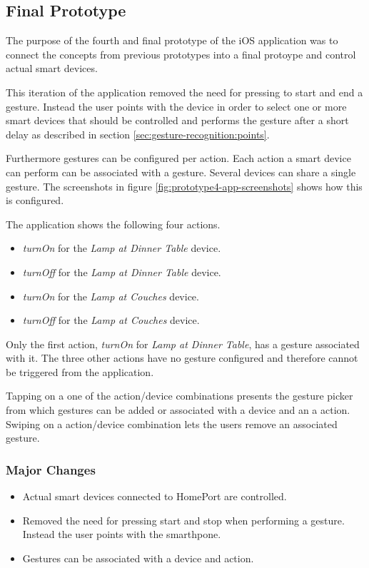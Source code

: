 \subsection{Final Prototype}
\label{sec:implementation:prototypes:prototype4}

The purpose of the fourth and final prototype of the iOS application was to connect the concepts from previous prototypes into a final protoype and control actual smart devices.

This iteration of the application removed the need for pressing to start and end a gesture. Instead the user points with the device in order to select one or more smart devices that should be controlled and performs the gesture after a short delay as described in section \ref{sec:gesture-recognition:points}.

Furthermore gestures can be configured per action. Each action a smart device can perform can be associated with a gesture. Several devices can share a single gesture. The screenshots in figure \ref{fig:prototype4-app-screenshots} shows how this is configured.

The application shows the following four actions.

\begin{itemize}
\item \emph{turnOn} for the \emph{Lamp at Dinner Table} device.
\item \emph{turnOff} for the \emph{Lamp at Dinner Table} device.
\item \emph{turnOn} for the \emph{Lamp at Couches} device.
\item \emph{turnOff} for the \emph{Lamp at Couches} device.
\end{itemize}

Only the first action, \emph{turnOn} for \emph{Lamp at Dinner Table}, has a gesture associated with it. The three other actions have no gesture configured and therefore cannot be triggered from the application.

Tapping on a one of the action/device combinations presents the gesture picker from which gestures can be added or associated with a device and an a action. Swiping on a action/device combination lets the users remove an associated gesture.

\subsubsection{Major Changes}

\begin{itemize}
\item Actual smart devices connected to HomePort are controlled.
\item Removed the need for pressing start and stop when performing a gesture. Instead the user points with the smarthpone.
\item Gestures can be associated with a device and action.
\end{itemize}

